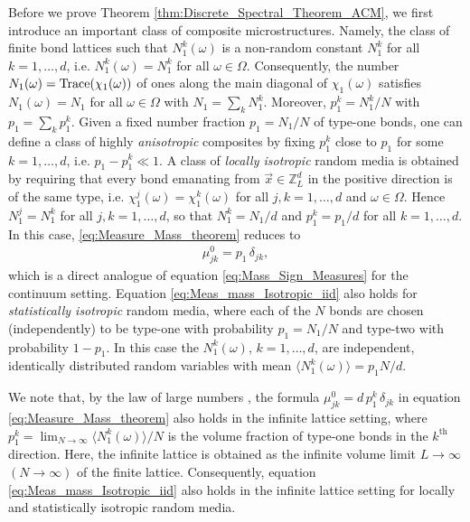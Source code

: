 \documentclass{cmslatex}
\begin{document}
Before we prove Theorem \ref{thm:Discrete_Spectral_Theorem_ACM}, we
first introduce an important class of composite
microstructures. Namely, the class of finite bond lattices such that
$N_1^k(\omega)$ is a non-random constant $N_1^k$ for all $k=1,\ldots,d$,
i.e. $N_1^k(\omega)=N_1^k$ for all $\omega\in\Omega$. Consequently, the number
$N_1(\omega)={\rm Trace}(\chi_1(\omega))$ of ones along the main diagonal of
$\chi_1(\omega)$ satisfies $N_1(\omega)=N_1$ for all $\omega\in\Omega$ with
$N_1=\sum_kN_1^k$. Moreover, $p_1^k=N_1^k/N$ with $p_1=\sum_kp_1^k$. Given a
fixed number fraction $p_1=N_1/N$ of type-one 
bonds, one can define a class of highly \emph{anisotropic} composites
by fixing $p_1^k$ close to $p_1$ for some $k=1,\ldots,d$,
i.e. $p_1-p_1^k\ll1$. A class of \emph{locally isotropic} random media is 
obtained by requiring that every bond emanating from
$\vec{x}\in\mathbb{Z}^d_L$ in the positive direction is of the same
type, i.e. $\chi_1^j(\omega)=\chi_1^k(\omega)$ for all $j,k=1,\ldots,d$ and $\omega\in\Omega$. Hence
$N_1^j=N_1^k$ for all $j,k=1,\ldots,d$, so that $N_1^k=N_1/d$ and
$p_1^k=p_1/d$ for all $k=1,\ldots,d$. In this case, 
\eqref{eq:Measure_Mass_theorem} reduces to
% 
\begin{align}\label{eq:Meas_mass_Isotropic_iid}
  \mu_{jk}^0=p_1\,\delta_{jk},
\end{align}
%
which is a direct analogue of equation \eqref{eq:Mass_Sign_Measures}
for the continuum setting.  Equation
\eqref{eq:Meas_mass_Isotropic_iid} also holds for \emph{statistically 
isotropic} random media, where each of the $N$ bonds are chosen
(independently) to be type-one with probability $p_1=N_1/N$ and
type-two with probability $1-p_1$. In this case the $N_1^k(\omega)$,
$k=1,\ldots,d$, are independent, identically distributed random variables
with mean $\langle N_1^k(\omega)\rangle=p_1N/d$.


We note that, by the law of large numbers
\cite{Durrett:Book:Probability}, the formula
$\mu_{jk}^0=d\,p_1^k\,\delta_{jk}$ in equation
\eqref{eq:Measure_Mass_theorem} also holds in the infinite lattice
setting, where $p_1^k=\lim_{N\to\infty}\langle N_1^k(\omega)\rangle/N$ is the volume fraction 
of type-one bonds in the $k^{\text{th}}$ direction. Here, the infinite
lattice is obtained as the infinite volume limit $L\to\infty$ $(N\to\infty)$ of the
finite lattice. Consequently, equation
\eqref{eq:Meas_mass_Isotropic_iid} also holds in the infinite lattice
setting for locally and statistically isotropic random media.
\end{document}
